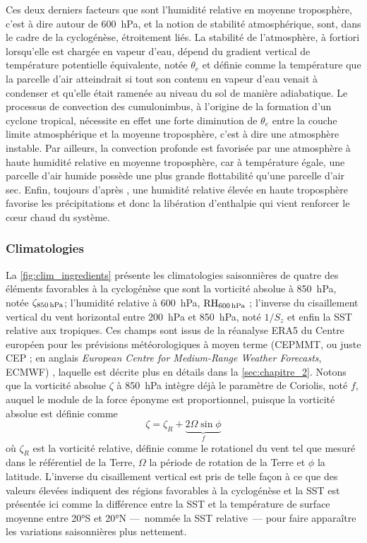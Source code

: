 \documentclass[../main.tex]{subfiles}
\begin{document}
Ces deux derniers facteurs que sont l'humidité relative en moyenne troposphère, c'est à dire autour de \SI{600}{\hecto\pascal}, et la notion de stabilité atmosphérique, sont, dans le cadre de la cyclogénèse, étroitement liés. La stabilité de l'atmosphère, à fortiori lorsqu'elle est chargée en vapeur d'eau, dépend du gradient vertical de température potentielle équivalente, notée $\theta_e$ et définie comme la température que la parcelle d'air atteindrait si tout son contenu en vapeur d'eau
venait à condenser et qu'elle était ramenée au niveau du sol de manière adiabatique. Le processus de convection des cumulonimbus, à l'origine de la formation d'un cyclone tropical, nécessite en effet une forte diminution de $\theta_e$ entre la couche limite atmosphérique et la moyenne troposphère, c'est à dire une atmosphère instable. Par ailleurs, la convection profonde est favorisée par une atmosphère à haute humidité relative en moyenne troposphère, car à température égale, une
parcelle d'air humide possède une plus grande flottabilité qu'une parcelle d'air sec. Enfin, toujours d'après \cite{gray_tropical_1975}, une humidité relative élevée en haute troposphère favorise les précipitations et donc la libération d'enthalpie qui vient renforcer le cœur chaud du système.

\subsubsection{Climatologies}

La \cref{fig:clim_ingredients} présente les climatologies saisonnières de quatre des éléments favorables à la cyclogénèse que sont la vorticité absolue à \SI{850}{\hecto\pascal}, notée $\zeta_{\text{\SI{850}{\hecto\pascal}}}$; l'humidité relative à \SI{600}{\hecto\pascal}, $\text{RH}_{\text{\SI{600}{\hecto\pascal}}}$ ; l'inverse du cisaillement vertical du vent horizontal entre \SI{200}{\hecto\pascal} et \SI{850}{\hecto\pascal}, noté $1/S_z$ et enfin la SST relative aux
tropiques. Ces champs sont issus de la réanalyse ERA5 du Centre européen pour les prévisions météorologiques à moyen terme (CEPMMT, ou juste CEP ; en anglais \textit{European Centre for Medium-Range Weather Forecasts}, ECMWF) \parencite{hersbach_era5_2020}, laquelle est décrite plus en détails dans la \cref{sec:chapitre_2}. Notons que la vorticité absolue $\zeta$ à \SI{850}{\hecto\pascal}
intègre déjà le paramètre de Coriolis, noté $f$, auquel le module de la force éponyme est proportionnel, puisque la vorticité absolue est définie comme
\begin{equation*}
    \zeta = \zeta_R + \underbrace{2 \Omega \sin \phi}_{f}
\end{equation*}
\noindent où $\zeta_R$ est la vorticité relative, définie comme le rotationel du vent tel que mesuré dans le référentiel de la Terre, $\Omega$ la période de rotation de la Terre et $\phi$ la latitude. L'inverse du cisaillement vertical est pris de telle façon à ce que des valeurs élevées indiquent des régions favorables à la cyclogénèse et la SST est présentée ici comme la différence entre la SST et la température de surface moyenne entre \ang{20}S et \ang{20}N ---~nommée la SST relative~--- pour faire apparaître les variations saisonnières plus nettement.
\end{document}
